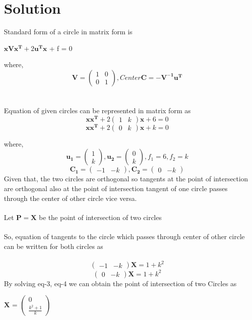 \documentclass[journal,12pt,twocolumn]{IEEEtran}
\newcommand{\myvec}[1]{\ensuremath{\begin{pmatrix}#1\end{pmatrix}}}
\let\vec\mathbf
\begin{document}
\section{Solution}
Standard form of a circle in matrix form is \\
\begin{center}
    $\vec{xVx^T} + 2\vec{u^Tx}$ + f = 0 \\
\end{center}
where, $$\vec{V} = \myvec{ 1 & 0 \\ 0 & 1}, Center \vec{C} = -\vec{V^{-1}u^T}$$\\
\\
Equation of given circles can be represented in matrix form as\\
\begin{equation}
    \vec{xx^T} + 2\myvec{ 1 & k}\vec{x} + 6 = 0 \label{eq-1}
\end{equation}
\begin{equation}
    \vec{xx^T} + 2\myvec{ 0 & k}\vec{x} + k = 0 \label{eq-2}
\end{equation}

where,\\
$$\vec{u_1} = \myvec{ 1 \\ k}, \vec{u_2} = \myvec{ 0 \\ k}, f_1 = 6 , f_2 = k$$
$$\vec{C_1} = \myvec{-1 & -k}, \vec{C_2} = \myvec{0 & -k}$$
Given that, the two circles are orthogonal so tangents at the point of intersection are orthogonal also at the point of intersection tangent of one circle passes through the center of other circle vice versa.\\
\\
Let $\vec{P}=\vec{X}$ be the point of intersection of two circles\\
\\
So, equation of tangents to the circle which passes through center of other circle can be written for both circles as\\
\\
\begin{equation}
    \myvec{-1 & -k}\vec{X} = 1 + k^2 \label{eq-3}
\end{equation}
\begin{equation}
    \myvec{0 & -k}\vec{X} = 1 + k^2 \label{eq-4}
\end{equation}
By solving eq-3, eq-4 we can obtain the point of intersection of two Circles as\\
\begin{center}
    $\vec{X}$ = $\myvec{0 \\ \frac{k^2 + 1}{k}}$
\end{center}
\end{document}
